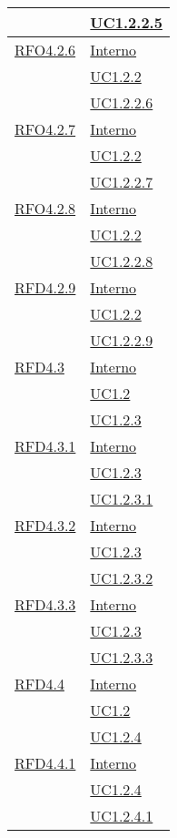 \begin{longtable}{|>{\centering}m{5cm}|m{5cm}<{\centering}|}
& \hyperref[UC1.2.2.5]{UC1.2.2.5}\\ \hline
\hyperlink{RFO4.2.6}{RFO4.2.6} & \hyperlink{Interno}{Interno}\\
& \hyperref[UC1.2.2]{UC1.2.2}\\
& \hyperref[UC1.2.2.6]{UC1.2.2.6}\\ \hline
\hyperlink{RFO4.2.7}{RFO4.2.7} & \hyperlink{Interno}{Interno}\\
& \hyperref[UC1.2.2]{UC1.2.2}\\
& \hyperref[UC1.2.2.7]{UC1.2.2.7}\\ \hline
\hyperlink{RFO4.2.8}{RFO4.2.8} & \hyperlink{Interno}{Interno}\\
& \hyperref[UC1.2.2]{UC1.2.2}\\
& \hyperref[UC1.2.2.8]{UC1.2.2.8}\\ \hline
\hyperlink{RFD4.2.9}{RFD4.2.9} & \hyperlink{Interno}{Interno}\\
& \hyperref[UC1.2.2]{UC1.2.2}\\
& \hyperref[UC1.2.2.9]{UC1.2.2.9}\\ \hline
\hyperlink{RFD4.3}{RFD4.3} & \hyperlink{Interno}{Interno}\\
& \hyperref[UC1.2]{UC1.2}\\
& \hyperref[UC1.2.3]{UC1.2.3}\\ \hline
\hyperlink{RFD4.3.1}{RFD4.3.1} & \hyperlink{Interno}{Interno}\\
& \hyperref[UC1.2.3]{UC1.2.3}\\
& \hyperref[UC1.2.3.1]{UC1.2.3.1}\\ \hline
\hyperlink{RFD4.3.2}{RFD4.3.2} & \hyperlink{Interno}{Interno}\\
& \hyperref[UC1.2.3]{UC1.2.3}\\
& \hyperref[UC1.2.3.2]{UC1.2.3.2}\\ \hline
\hyperlink{RFD4.3.3}{RFD4.3.3} & \hyperlink{Interno}{Interno}\\
& \hyperref[UC1.2.3]{UC1.2.3}\\
& \hyperref[UC1.2.3.3]{UC1.2.3.3}\\ \hline
\hyperlink{RFD4.4}{RFD4.4} & \hyperlink{Interno}{Interno}\\
& \hyperref[UC1.2]{UC1.2}\\
& \hyperref[UC1.2.4]{UC1.2.4}\\ \hline
\hyperlink{RFD4.4.1}{RFD4.4.1} & \hyperlink{Interno}{Interno}\\
& \hyperref[UC1.2.4]{UC1.2.4}\\
& \hyperref[UC1.2.4.1]{UC1.2.4.1}\\ \hline

\end{longtable}
